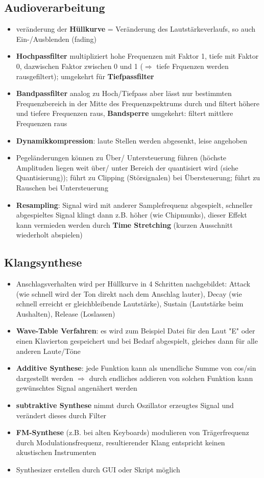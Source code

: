 \documentclass[12pt,landscape]{article}
\begin{document}
\begin{multicols}{3}
\subsection{Audioverarbeitung}
\begin{itemize}
\item veränderung der \textbf{Hüllkurve} = Veränderung des Lautstärkeverlaufs, so auch Ein-/Ausblenden (fading)
\item \textbf{Hochpassfilter} multipliziert hohe Frequenzen mit Faktor 1, tiefe mit Faktor 0, dazwischen Faktor zwischen 0 und 1 ($\Rightarrow$ tiefe Frquenzen werden rausgefiltert); umgekehrt für \textbf{Tiefpassfilter}
\item \textbf{Bandpassfilter} analog zu Hoch/Tiefpass aber lässt nur bestimmten Frequenzbereich in der Mitte des Frequenzspektrums durch und filtert höhere und tiefere Frequenzen raus, \textbf{Bandsperre} umgekehrt: filtert mittlere Frequenzen raus
\item \textbf{Dynamikkompression}: laute Stellen werden abgesenkt, leise angehoben
\item Pegeländerungen können zu Über/ Untersteuerung führen (höchste Amplituden liegen weit über/ unter Bereich der quantisiert wird (siehe Quantisierung)); führt zu Clipping (Störsignalen) bei Übersteuerung; führt zu Rauschen bei Untersteuerung
\item \textbf{Resampling}: Signal wird mit anderer Samplefrequenz abgespielt, schneller abgespieltes Signal klingt dann z.B. höher (wie Chipmunks), dieser Effekt kann vermieden werden durch \textbf{Time Stretching} (kurzen Ausschnitt wiederholt abspielen)
\end{itemize}
\subsection{Klangsynthese}
\begin{itemize}
\item Anschlagsverhalten wird per Hüllkurve in 4 Schritten nachgebildet: Attack (wie schnell wird der Ton direkt nach dem Anschlag lauter), Decay (wie schnell erreicht er gleichbleibende Lautstärke), Sustain (Lautstärke beim Aushalten), Release (Loslassen)
\item \textbf{Wave-Table Verfahren}: es wird zum Beispiel Datei für den Laut "E" oder einen Klavierton gespeichert und bei Bedarf abgespielt, gleiches dann für alle anderen Laute/Töne 
\item \textbf{Additive Synthese}: jede Funktion kann als unendliche Summe von cos/sin dargestellt werden $\Rightarrow$ durch endliches addieren von solchen Funktion kann gewünschtes Signal angenähert werden 
\item \textbf{subtraktive Synthese} nimmt durch Oszillator erzeugtes Signal und verändert dieses durch Filter
\item \textbf{FM-Synthese} (z.B. bei alten Keyboards) modulieren von Trägerfrequenz durch Modulationsfrequenz, resultierender Klang entspricht keinen akustischen Instrumenten
\item Synthesizer erstellen durch GUI oder Skript möglich 
\end{itemize}



\end{multicols}
\end{document}
